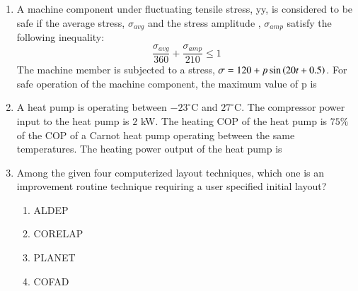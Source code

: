 \documentclass[journal,12pt,onecolumn]{IEEEtran}
\theoremstyle{remark}
\begin{document}
\begin{enumerate}
\item A machine component under fluctuating tensile stress, yy, is considered to be safe if the average stress, $\sigma_{avg}$  and the stress amplitude , $\sigma_{amp}$  satisfy the following inequality:
$$ \frac{\sigma_{avg}}{360} + \frac{\sigma_{amp}}{210} \le 1 $$
The machine member is subjected to a stress, $\sigma = 120 + p \sin\left(20t+0.5\right)$. For safe operation of the machine component, the maximum value of p  is
\hfill{}
\begin{enumerate}
\end{enumerate}

\item A heat pump is operating between $-23^{\circ}\text{C}$ and $27^{\circ}\text{C}$. The compressor power input to the heat pump is $2$ kW. The heating COP  of the heat pump is $75\%$ of the COP of a Carnot heat pump operating between the same temperatures. The heating power output  of the heat pump is
\hfill{}
\begin{enumerate}
\end{enumerate}

\item Among the given four computerized layout techniques, which one is an improvement routine technique requiring a user specified initial layout?
\hfill{}
\begin{enumerate}
\item ALDEP 
\item CORELAP 
\item PLANET 
\item COFAD 
\end{enumerate}


\end{enumerate}
\end{document}
